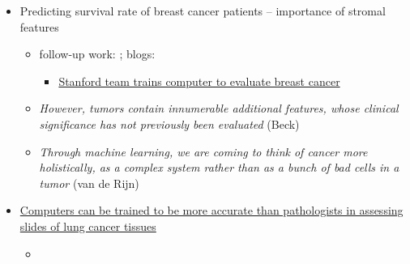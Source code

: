 \documentclass{article}
\begin{document}
\begin{itemize}
\item Predicting survival rate of breast cancer patients -- importance of stromal features \cite{beck2011systematic}
\begin{itemize}
\item follow-up work: \cite{conklin2012stroma}; blogs: 
\begin{itemize}
\item \href{http://med.stanford.edu/news/all-news/2011/11/stanford-team-trains-computer-to-evaluate-breast-cancer.html}{Stanford team trains computer to evaluate breast cancer
}
\end{itemize}
\item \textit{However, tumors contain innumerable additional features, whose clinical significance has not previously been evaluated} (Beck)
\item \textit{Through machine learning, we are coming to think of cancer more holistically, as a complex system rather than as a bunch of bad cells in a tumor} (van de Rijn)
\end{itemize}
\item \href{https://www.sciencedaily.com/releases/2016/08/160816084735.htm}{Computers can be trained to be more accurate than pathologists in assessing slides of lung cancer tissues} \cite{yu2016predicting}
\begin{itemize}
\item 
\end{itemize}
\end{itemize}



\end{document}
